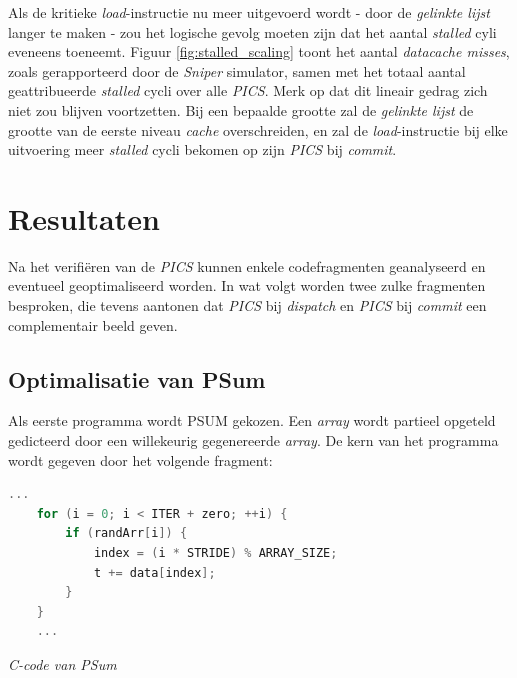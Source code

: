 \documentclass[12pt,a4paper,faculty=ea,language=nl]{ugent-doc}
\begin{document}
Als de kritieke \textit{load}-instructie nu meer uitgevoerd wordt - door de \textit{gelinkte lijst} langer te maken - zou het logische gevolg moeten zijn dat het aantal \textit{stalled} cyli eveneens toeneemt. Figuur \ref{fig:stalled_scaling} toont het aantal \textit{datacache misses}, zoals gerapporteerd door de \textit{Sniper} simulator, samen met het totaal aantal geattribueerde \textit{stalled} cycli over alle \textit{PICS}. Merk op dat dit lineair gedrag zich niet zou blijven voortzetten. Bij een bepaalde grootte zal de \textit{gelinkte lijst} de grootte van de eerste niveau \textit{cache} overschreiden, en zal de \textit{load}-instructie bij elke uitvoering meer \textit{stalled} cycli bekomen op zijn \textit{PICS} bij \textit{commit}.

\section{Resultaten}
\label{sectie:resultaten}
Na het verifiëren van de \textit{PICS} kunnen enkele codefragmenten geanalyseerd en eventueel geoptimaliseerd worden. In wat volgt worden twee zulke fragmenten besproken, die tevens aantonen dat \textit{PICS} bij \textit{dispatch} en \textit{PICS} bij \textit{commit} een complementair beeld geven.

\subsection{Optimalisatie van PSum}
\label{dispatch}
Als eerste programma wordt PSUM gekozen. Een \textit{array} wordt partieel opgeteld gedicteerd door een willekeurig gegenereerde \textit{array}. De kern van het programma wordt gegeven door het volgende fragment:
\begin{lstlisting}[language=C]
    ...
    for (i = 0; i < ITER + zero; ++i) {
        if (randArr[i]) {
            index = (i * STRIDE) % ARRAY_SIZE;
            t += data[index];
        }
    }
    ...
\end{lstlisting}
\vspace{-1em}
\hspace{5em}
\noindent\textit{\small C-code van PSum}
\end{document}
